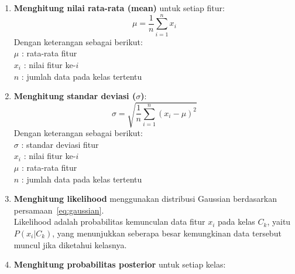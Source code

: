 \begin{enumerate}
	\item \textbf{Menghitung nilai rata-rata (mean)} untuk setiap fitur:
			\begin{equation}
				\mu = \frac{1}{n} \sum_{i=1}^{n} x_i
				\label{eq:mean}
			\end{equation}
		Dengan keterangan sebagai berikut:\\[0.5em]
		\hspace*{1.5em}$\mu$ : rata-rata fitur\\
		\hspace*{1.5em}$x_i$ : nilai fitur ke-$i$\\
		\hspace*{1.5em}$n$ : jumlah data pada kelas tertentu

		\item \textbf{Menghitung standar deviasi ($\sigma$)}:
			\begin{equation}
				\sigma = \sqrt{ \frac{1}{n} \sum_{i=1}^{n} (x_i - \mu)^2 }
				\label{eq:stddev}
			\end{equation}
			Dengan keterangan sebagai berikut:\\[0.5em]
			\hspace*{1.5em}$\sigma$ : standar deviasi fitur\\
			\hspace*{1.5em}$x_i$ : nilai fitur ke-$i$\\
			\hspace*{1.5em}$\mu$ : rata-rata fitur\\
			\hspace*{1.5em}$n$ : jumlah data pada kelas tertentu

		\item \textbf{Menghitung likelihood} menggunakan distribusi Gaussian berdasarkan persamaan~\eqref{eq:gaussian}.\\
		Likelihood adalah probabilitas kemunculan data fitur $x_i$ pada kelas $C_k$, yaitu $P(x_i|C_k)$, yang menunjukkan seberapa besar kemungkinan data tersebut muncul jika diketahui kelasnya.

		\item \textbf{Menghitung probabilitas posterior} untuk setiap kelas:
	

\end{enumerate}

